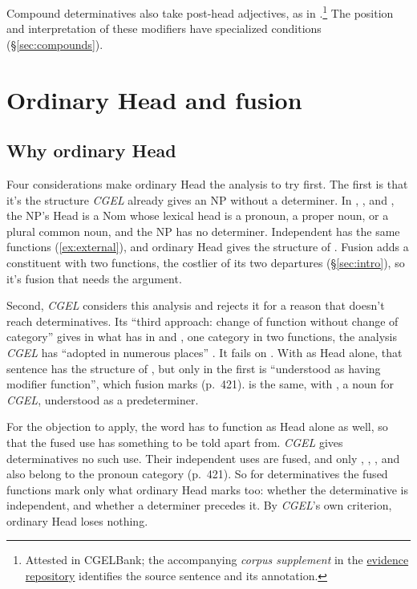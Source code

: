 \documentclass[12pt]{article}
\begin{document}
Compound determinatives also take post-head adjectives, as in .\footnote{Attested in CGELBank; the accompanying \textit{corpus supplement} in the \href{https://github.com/BrettRey/determinatives-as-nouns}{evidence repository} identifies the source sentence and its annotation.} The position and interpretation of these modifiers have specialized conditions (§\ref{sec:compounds}).

\section{Ordinary Head and fusion}\label{sec:evidence}

\subsection{Why ordinary Head}\label{sec:motivation}

Four considerations make ordinary Head the analysis to try first. The first is that it's the structure \textit{CGEL} already gives an NP without a determiner. In , , and , the NP's Head is a Nom whose lexical head is a pronoun, a proper noun, or a plural common noun, and the NP has no determiner. Independent  has the same functions (\ref{ex:external}), and ordinary Head gives  the structure of . Fusion adds a constituent with two functions, the costlier of its two departures (§\ref{sec:intro}), so it's fusion that needs the argument.

Second, \textit{CGEL} considers this analysis and rejects it for a reason that doesn't reach determinatives. Its \enquote{third approach: change of function without change of category} gives  in  what  has in  and , one category in two functions, the analysis \textit{CGEL} has \enquote{adopted in numerous places} \citep[421]{huddleston2002}. It fails on . With  as Head alone, that sentence has the structure of , but only in the first is  \enquote{understood as having modifier function}, which fusion marks (p.~421).  is the same, with , a noun for \textit{CGEL}, understood as a predeterminer.

For the objection to apply, the word has to function as Head alone as well, so that the fused use has something to be told apart from. \textit{CGEL} gives determinatives no such use. Their independent uses are fused, and only , , , and  also belong to the pronoun category (p.~421). So for determinatives the fused functions mark only what ordinary Head marks too: whether the determinative is independent, and whether a determiner precedes it. By \textit{CGEL}'s own criterion, ordinary Head loses nothing.
\end{document}
